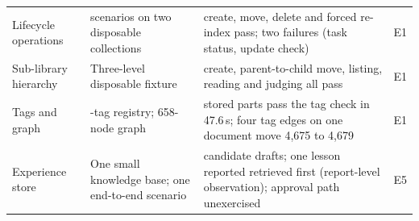 \documentclass[final,5p,times,twocolumn]{elsarticle}
\begin{document}
\begin{table}[t]
\begin{tabular}{@{}>{\raggedright\arraybackslash}p{}>{\raggedright\arraybackslash}p{}>{\raggedright\arraybackslash}p{}>{\raggedright\arraybackslash}p{}@{}}
Lifecycle operations & 16 scenarios on two disposable collections & create, move, delete and forced re-index pass; two failures (task status, update check) & E1\\
Sub-library hierarchy & Three-level disposable fixture & create, parent-to-child move, listing, reading and judging all pass & E1\\
Tags and graph & 316-tag registry; 658-node graph & 165 stored parts pass the tag check in 47.6\,s; four tag edges on one document move 4{,}675 to 4{,}679 & E1\\
Experience store & One small knowledge base; one end-to-end scenario & 13 candidate drafts; one lesson reported retrieved first (report-level observation); approval path unexercised & E5\\
\bottomrule
\end{tabular}
\end{table}
\end{document}
